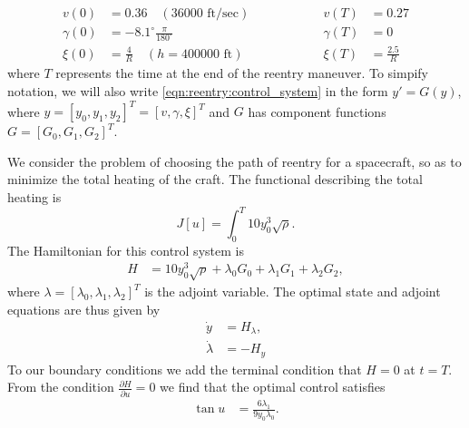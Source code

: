 % 
\begin{equation}
  \begin{split}
    v(0) &= 0.36 \quad (36000 \text{ ft/sec})\\
    \gamma(0) &= -8.1^\circ \frac{\pi}{180^\circ}\\
    \xi(0)&= \frac{4}{R}\quad (h = 400000 \text{ ft})
  \end{split}
\quad \quad \quad \quad \quad
  \begin{split}
    v(T) &= 0.27\\
    \gamma(T) &= 0 \\
	\xi(T)&= \frac{2.5}{R}
  \end{split}
\end{equation}
where $T$ represents the time at the end of the reentry maneuver. 
To simpify notation, we will also write \eqref{eqn:reentry:control_system} in the form $y' = G(y)$, where $y = [y_0, y_1, y_2]^T=[v,\gamma, \xi]^T$ and $G$ has component functions $G = [G_0, G_1, G_2]^T$. 

We consider the problem of choosing the path of reentry for a spacecraft, so as to minimize the total heating of the craft. 
The functional describing the total heating is 
\[
J[u] = \int_0^T 10y_0^3 \sqrt{\rho}.
\]
The Hamiltonian for this control system is 
\begin{align}
H &=  10y_0^3 \sqrt{\rho} + \lambda_0G_0 + \lambda_1G_1 + \lambda_2G_2,
\end{align}
where $\lambda = [\lambda_0,\lambda_1,\lambda_2]^T$ is the adjoint variable. 
The optimal state and adjoint equations are thus given by 
\begin{align}
	\dot{y} &= H_{\lambda},\\
	\dot{\lambda} &= -H_{y} \label{eqn:reentry:adjoint_system}
\end{align}
To our boundary conditions we add the terminal condition that $H = 0$ at $t = T$.  From the condition $\frac{\partial H}{\partial u} = 0$ we find that the optimal control satisfies
\begin{align}
\tan u &= \frac{6\lambda_1}{9y_0\lambda_0}.
\end{align}

